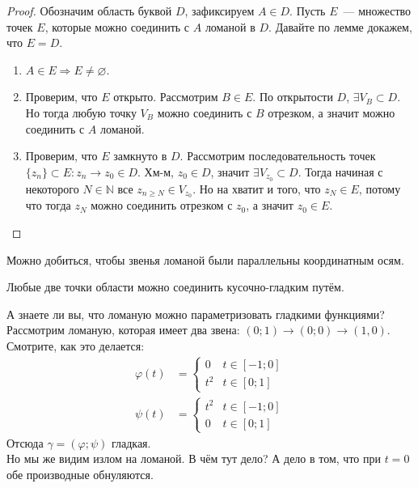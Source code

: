 \documentclass{article}
\begin{document}
    \begin{proof}
        Обозначим область буквой $D$, зафиксируем $A\in D$. Пусть $E$~--- множество точек $E$, которые можно соединить с $A$ ломаной в $D$. Давайте по лемме докажем, что $E=D$.
        \begin{enumerate}
            \item $A\in E\Rightarrow E\neq\varnothing$.
            \item Проверим, что $E$ открыто. Рассмотрим $B\in E$. По открытости $D$, $\exists V_B\subset D$. Но тогда любую точку $V_B$ можно соединить с $B$ отрезком, а значит можно соединить с $A$ ломаной.
            \item Проверим, что $E$ замкнуто в $D$. Рассмотрим последовательность точек $\{z_n\}\subset E:z_n\rightarrow z_0\in D$. Хм-м, $z_0\in D$, значит $\exists V_{z_0}\subset D$. Тогда начиная с некоторого $N\in\mathbb N$ все $z_{n\geqslant N}\in V_{z_0}$. Но на хватит и того, что $z_N\in E$, потому что тогда $z_N$ можно соединить отрезком с $z_0$, а значит $z_0\in E$.
        \end{enumerate}
    \end{proof}
    \begin{remark}
        Можно добиться, чтобы звенья ломаной были параллельны координатным осям.
    \end{remark}
    \begin{corollary}
        Любые две точки области можно соединить кусочно-гладким путём.
    \end{corollary}
    \begin{remark}
        А знаете ли вы, что ломаную можно параметризовать гладкими функциями? Рассмотрим ломаную, которая имеет два звена: $(0;1)\to(0;0)\to(1,0)$. Смотрите, как это делается:
        \begin{align*}
            \varphi(t)&=\begin{cases}
                0&t\in[-1;0]\\
                t^2&t\in[0;1]
            \end{cases}\\
            \psi(t)&=\begin{cases}
                t^2&t\in[-1;0]\\
                0&t\in[0;1]
            \end{cases}
        \end{align*}
        Отсюда $\gamma=(\varphi;\psi)$ гладкая.\\
        Но мы же видим излом на ломаной. В чём тут дело? А дело в том, что при $t=0$ обе производные обнуляются.
    \end{remark}
\end{document}
